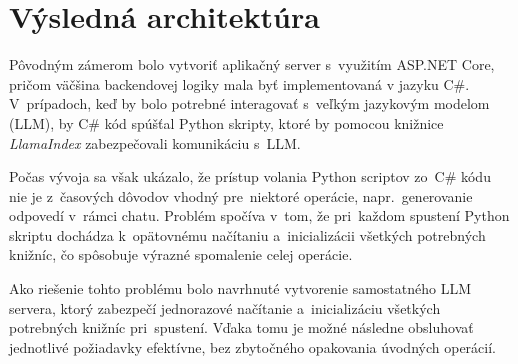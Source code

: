 \section{Výsledná architektúra}

Pôvodným zámerom bolo vytvoriť aplikačný server s~využitím ASP.NET Core, pričom väčšina backendovej logiky mala byť implementovaná v jazyku C\#. V~prípadoch, keď by bolo potrebné interagovať s~veľkým jazykovým modelom (LLM), by C\# kód spúšťal Python skripty, ktoré by pomocou knižnice \textit{LlamaIndex} zabezpečovali komunikáciu s~LLM.

Počas vývoja sa však ukázalo, že prístup volania Python scriptov zo~C\# kódu nie je z~časových dôvodov vhodný pre~niektoré operácie, napr.~generovanie odpovedí v~rámci chatu. Problém spočíva v~tom, že pri~každom spustení Python skriptu dochádza k~opätovnému načítaniu a~inicializácii všetkých potrebných knižníc, čo spôsobuje výrazné spomalenie celej operácie.

Ako riešenie tohto problému bolo navrhnuté vytvorenie samostatného LLM servera, ktorý zabezpečí jednorazové načítanie a~inicializáciu všetkých potrebných knižníc pri~spustení. Vďaka tomu je možné následne obsluhovať jednotlivé požiadavky efektívne, bez zbytočného opakovania úvodných operácií.

